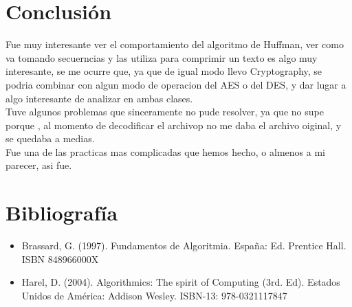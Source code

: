 \documentclass[spanish]{article}
\begin{document}
	\newpage

	\section{Conclusi\'on}
Fue muy interesante ver el comportamiento del algoritmo de Huffman, ver como va tomando secuerncias y las utiliza para comprimir un texto es algo muy interesante, se me ocurre que, ya que de igual modo llevo Cryptography, se podria combinar con algun modo de operacion del AES o del DES, y dar lugar a algo interesante de analizar en ambas clases.\\Tuve algunos problemas que sinceramente no pude resolver, ya que no supe porque , al momento de decodificar el archivop no me daba el archivo oiginal, y se quedaba a medias.\\Fue una de las practicas mas complicadas que hemos hecho, o almenos a mi parecer, asi fue.
	

	\bigskip

	\newpage

	\section{Bibliografía}
	\begin{itemize}
		\item Brassard, G. (1997). Fundamentos de Algoritmia. España: Ed. Prentice Hall. ISBN 		848966000X
		\item Harel, D. (2004). Algorithmics: The spirit of Computing (3rd. Ed). Estados Unidos de América: Addison
Wesley. ISBN-13: 978-0321117847
	\end{itemize}
\end{document}
